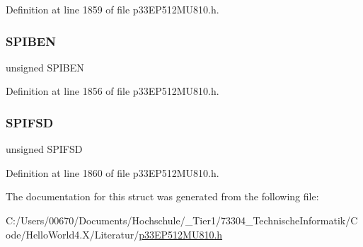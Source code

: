 Definition at line 1859 of file p33\+E\+P512\+M\+U810.\+h.

\mbox{\label{structtag_s_p_i1_c_o_n2_b_i_t_s_a48f1b49d7589da2ee8c38cd6d820a542}} 
\subsubsection{\texorpdfstring{S\+P\+I\+B\+EN}{SPIBEN}}
{\footnotesize\ttfamily unsigned S\+P\+I\+B\+EN}



Definition at line 1856 of file p33\+E\+P512\+M\+U810.\+h.

\mbox{\label{structtag_s_p_i1_c_o_n2_b_i_t_s_aeb3b552a9f7c25bc1ae09655904e34cc}} 
\subsubsection{\texorpdfstring{S\+P\+I\+F\+SD}{SPIFSD}}
{\footnotesize\ttfamily unsigned S\+P\+I\+F\+SD}



Definition at line 1860 of file p33\+E\+P512\+M\+U810.\+h.



The documentation for this struct was generated from the following file\+:\begin{DoxyCompactItemize}
\item 
C\+:/\+Users/00670/\+Documents/\+Hochschule/\+\_\+\+Tier1/73304\+\_\+\+Technische\+Informatik/\+Code/\+Hello\+World4.\+X/\+Literatur/\hyperlink{p33_e_p512_m_u810_8h}{p33\+E\+P512\+M\+U810.\+h}\end{DoxyCompactItemize}
